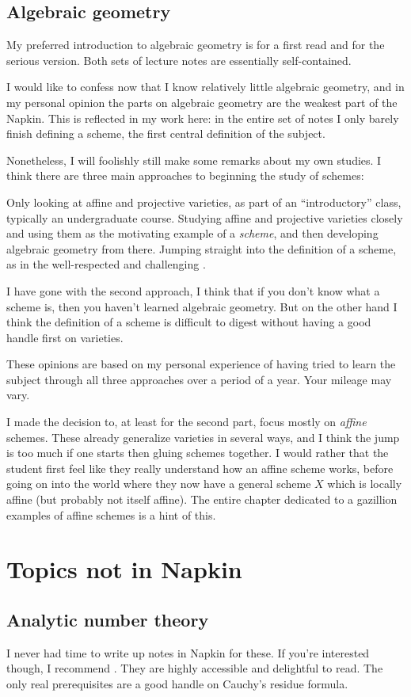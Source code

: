 \subsection{Algebraic geometry}
My preferred introduction to algebraic geometry is \cite{ref:gathmann}
for a first read and \cite{ref:vakil} for the serious version.
Both sets of lecture notes are essentially self-contained.

I would like to confess now that I know relatively little algebraic geometry,
and in my personal opinion the parts on algebraic geometry
are the weakest part of the Napkin.
This is reflected in my work here:
in the entire set of notes I only barely finish defining a scheme,
the first central definition of the subject.

Nonetheless, I will foolishly still make some remarks about my own studies.
I think there are three main approaches to beginning the study of schemes:
\begin{itemize}
	\ii Only looking at affine and projective varieties,
	as part of an ``introductory'' class,
	typically an undergraduate course.
	\ii Studying affine and projective varieties closely
	and using them as the motivating example of a \emph{scheme},
	and then developing algebraic geometry from there.
	\ii Jumping straight into the definition of a scheme,
	as in the well-respected and challenging \cite{ref:vakil}.
\end{itemize}
I have gone with the second approach,
I think that if you don't know what a scheme is,
then you haven't learned algebraic geometry.
But on the other hand I think the definition of a scheme is
difficult to digest without having a good handle first on varieties.

These opinions are based on my personal experience of having
tried to learn the subject through all
three approaches over a period of a year.
Your mileage may vary.

I made the decision to, at least for the second part,
focus mostly on \emph{affine} schemes.
These already generalize varieties in several ways,
and I think the jump is too much if one starts
then gluing schemes together.
I would rather that the student first feel like
they really understand how an affine scheme works,
before going on into the world where they now have a general scheme $X$
which is locally affine (but probably not itself affine).
The entire chapter dedicated to a gazillion examples
of affine schemes is a hint of this.

\section{Topics not in Napkin}
\subsection{Analytic number theory}
I never had time to write up notes in Napkin for these.
If you're interested though, I recommend \cite{ref:analytic_NT}.
They are highly accessible and delightful to read.
The only real prerequisites are a good handle on Cauchy's residue formula.
